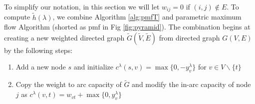 \documentclass{article}
\begin{document}
To simplify our notation, in this section we will let $w_{ij} = 0$ if $(i,j) \not\in E$. To compute $\tilde{h}(\lambda)$, we combine Algorithm \ref{alg:pmfT} and parametric maximum flow Algorithm (shorted as pmf in Fig \ref{fig:pyramid}). The combination begins at creating a new weighted directed graph $\widetilde{G}(\widetilde{V}, \widetilde{E})$ from directed graph $G(V,E)$ by the following steps:
\begin{enumerate}
	\item Add a new node $s$ and initialize $c^{\lambda}(s,v)=\max\{0, -y^{\lambda}_v\}$ for $v \in V\backslash \{t\}$
	\item Copy the weight to arc capacity of $\widetilde{G}$ and modify the in-arc capacity of node $j$ as $c^{\lambda}(v,t) = w_{vt} + \max\{0, y^{\lambda}_v\}$
	\end{enumerate}
\end{document}
